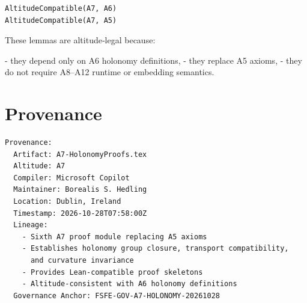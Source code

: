 \documentclass[11pt]{article}
\begin{document}
\begin{verbatim}
AltitudeCompatible(A7, A6)
AltitudeCompatible(A7, A5)
\end{verbatim}

These lemmas are altitude‑legal because:

- they depend only on A6 holonomy definitions,
- they replace A5 axioms,
- they do not require A8–A12 runtime or embedding semantics.

\newpage


\section*{Provenance}

\begin{verbatim}
Provenance:
  Artifact: A7-HolonomyProofs.tex
  Altitude: A7
  Compiler: Microsoft Copilot
  Maintainer: Borealis S. Hedling
  Location: Dublin, Ireland
  Timestamp: 2026-10-28T07:58:00Z
  Lineage:
    - Sixth A7 proof module replacing A5 axioms
    - Establishes holonomy group closure, transport compatibility,
      and curvature invariance
    - Provides Lean-compatible proof skeletons
    - Altitude-consistent with A6 holonomy definitions
  Governance Anchor: FSFE-GOV-A7-HOLONOMY-20261028
\end{verbatim}
\end{document}
